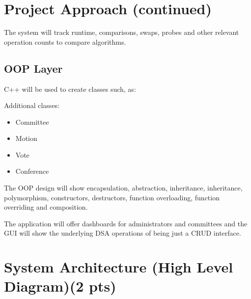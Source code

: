 \documentclass[11pt,a4paper]{article}
\newcommand{\sectiontitle}[1]{\vspace{3pt}\section*{#1}\vspace{2pt}}
\begin{document}
\newpage

\sectiontitle{Project Approach (continued)}

The system will track runtime, comparisons, swaps, probes and other relevant operation counts to
compare algorithms.

\subsection*{OOP Layer}
C++ will be used to create classes such, as:
\begin{center}
\end{center}

Additional classes:
\begin{itemize}[leftmargin=1.3em,itemsep=3pt]
    \item Committee
    \item Motion
    \item Vote
    \item Conference
\end{itemize}

The OOP design will show encapsulation, abstraction, inheritance, inheritance, polymorphism,
constructors, destructors, function overloading, function overriding and composition.

The application will offer dashboards for administrators and committees and the GUI will show the
underlying DSA operations of being just a CRUD interface.

\newpage

\sectiontitle{System Architecture (High Level Diagram)(2 pts)}
\end{document}
